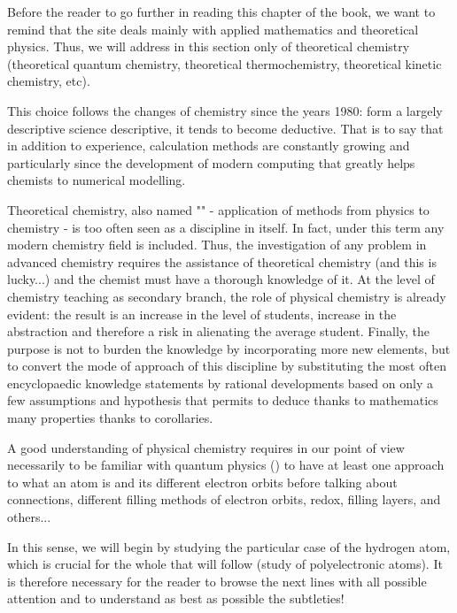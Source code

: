 	Before the reader to go further in reading this chapter of the book, we want to remind that the site deals mainly with applied mathematics and theoretical physics. Thus, we will address in this section only of theoretical chemistry (theoretical quantum  chemistry, theoretical thermochemistry, theoretical kinetic chemistry, etc).
	
	This choice follows the changes of chemistry since the years 1980: form a largely descriptive science descriptive, it tends to become deductive. That is to say that in addition to experience, calculation methods are constantly growing and particularly since the development of modern computing that greatly helps chemists to numerical modelling.	
	
	Theoretical chemistry, also named "" - application of methods from physics to chemistry - is too often seen as a discipline in itself. In fact, under this term any modern chemistry field is included. Thus, the investigation of any problem in advanced chemistry requires the assistance of theoretical chemistry (and this is lucky...) and the chemist must have a thorough knowledge of it. At the level of chemistry teaching as secondary branch, the role of physical chemistry is already evident: the result is an increase in the level of students, increase in the abstraction and therefore a risk in alienating the average student. Finally, the purpose is not to burden the knowledge by incorporating more new elements, but to convert the mode of approach of this discipline by substituting the most often encyclopaedic knowledge statements by rational developments based on only a few assumptions and hypothesis that permits to deduce thanks to mathematics many properties thanks to corollaries.
	
	A good understanding of physical chemistry requires in our point of view necessarily to be familiar with quantum physics () to have at least one approach to what an atom is and its different electron orbits before talking about connections, different filling methods of electron orbits, redox, filling layers, and others...
	
	In this sense, we will begin by studying the particular case of the hydrogen atom, which is crucial for the whole that will follow (study of polyelectronic atoms). It is therefore necessary for the reader to browse the next lines with all possible attention and to understand as best as possible the subtleties!
	
